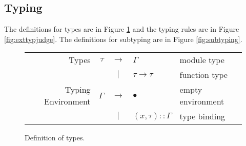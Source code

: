\documentclass{article}
\theoremstyle{definition}
\newcommand*{\vbar}{|}
\newcommand*{\cons}{::}
\begin{document}
\subsection{Typing}
The definitions for types are in Figure \ref{fig:exttypdom} and the typing rules are in Figure \ref{fig:exttypjudge}.
The definitions for subtyping are in Figure \ref{fig:subtyping}.

\begin{figure}[h!]
  \centering
  \begin{tabular}{rrcll}
    Types              & $\tau$   & $\rightarrow$ & $\Gamma$               & module type       \\
                       &          & $\vbar$       & $\tau\rightarrow\tau$  & function type     \\
    Typing Environment & $\Gamma$ & $\rightarrow$ & $\bullet$              & empty environment \\
                       &          & $\vbar$       & $(x,\tau)\cons \Gamma$ & type binding
  \end{tabular}
  \caption{Definition of types.}
  \label{fig:exttypdom}
\end{figure}
\end{document}
